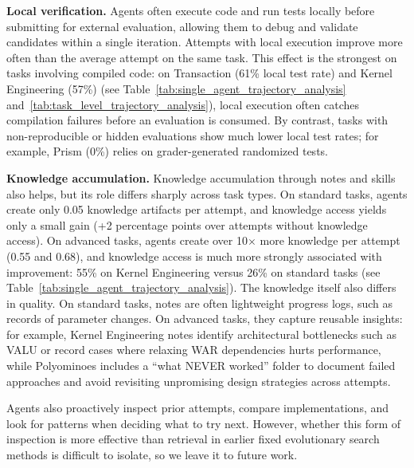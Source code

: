 \textbf{Local verification.} Agents often execute code and run tests locally before submitting for external evaluation, allowing them to debug and validate candidates within a single iteration. Attempts with local execution improve more often than the average attempt on the same task. This effect is the strongest on tasks involving compiled code: on Transaction (61\% local test rate) and Kernel Engineering (57\%) (see Table~\ref{tab:single_agent_trajectory_analysis} and~\ref{tab:task_level_trajectory_analysis}), local execution often catches compilation failures before an evaluation is consumed. By contrast, tasks with non-reproducible or hidden evaluations show much lower local test rates; for example, Prism (0\%) relies on grader-generated randomized tests.

\textbf{Knowledge accumulation.} Knowledge accumulation through notes and skills also helps, but its role differs sharply across task types. On standard tasks, agents create only 0.05 knowledge artifacts per attempt, and knowledge access yields only a small gain (+2 percentage points over attempts without knowledge access). On advanced tasks, agents create over 10$\times$ more knowledge per attempt (0.55 and 0.68), and knowledge access is much more strongly associated with improvement: 55\% on Kernel Engineering versus 26\% on standard tasks (see Table~\ref{tab:single_agent_trajectory_analysis}). The knowledge itself also differs in quality. On standard tasks, notes are often lightweight progress logs, such as records of parameter changes. On advanced tasks, they capture reusable insights: for example, Kernel Engineering notes identify architectural bottlenecks such as VALU or record cases where relaxing WAR dependencies hurts performance, while Polyominoes includes a ``what NEVER worked'' folder to document failed approaches and avoid revisiting unpromising design strategies across attempts.

Agents also proactively inspect prior attempts, compare implementations, and look for patterns when deciding what to try next. However, whether this form of inspection is more effective than retrieval in earlier fixed evolutionary search methods is difficult to isolate, so we leave it to future work.






